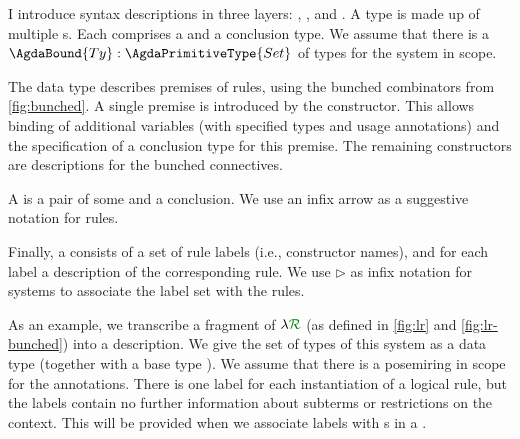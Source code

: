 I introduce syntax descriptions in three layers: ,
, and .
A type  is made up of multiple s.
Each  comprises a  and
a conclusion type. We assume that there is a
$\AgdaBound{Ty} : \AgdaPrimitiveType{Set}$ of types for the system in
scope.

The  data type describes premises of rules,
using the bunched combinators from \cref{fig:bunched}. A single
premise is introduced by the
constructor.  This allows binding of additional variables
\AgdaBound{$\Delta$} (with specified types and usage annotations) and
the specification of a conclusion type  for this premise.
The remaining constructors are descriptions for the
bunched connectives. %


A  is a pair of some  and a
conclusion. We use an infix arrow as a suggestive notation for rules.


Finally, a  consists of a set of rule labels (i.e.,
constructor names), and for each label a description of the
corresponding rule. We use $\rhd$ as infix notation for systems to
associate the label set with the rules.



As an example, we transcribe a fragment of $\name$ (as defined in
\cref{fig:lr} and \cref{fig:lr-bunched}) into a description.
We give the set of types of
this system as a data type  (together with a base
type \AgdaInductiveConstructor{$\iota$}). We assume that there is a
posemiring  in scope for the
annotations.
There is one label for each instantiation of a logical
rule, but the labels contain no further information about subterms or
restrictions on the context. This will be provided when we associate
labels with s in a .

